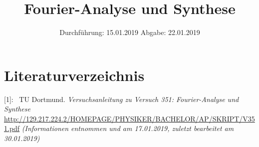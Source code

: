 

\subject{Nr. 351}
\title{Fourier-Analyse und Synthese}
\date{%
  Durchführung: 15.01.2019
  \hspace{3em}
  Abgabe: 22.01.2019
}



\maketitle
\thispagestyle{empty}
\tableofcontents
\newpage






\printbibliography{}

\section{Literaturverzeichnis}

[1]: \ TU Dortmund. \textit{Versuchsanleitung zu Versuch 351: Fourier-Analyse und Synthese}\newline
\url{http://129.217.224.2/HOMEPAGE/PHYSIKER/BACHELOR/AP/SKRIPT/V351.pdf}
\textit{(Informationen entnommen und am 17.01.2019, zuletzt bearbeitet am 30.01.2019)}\newline


